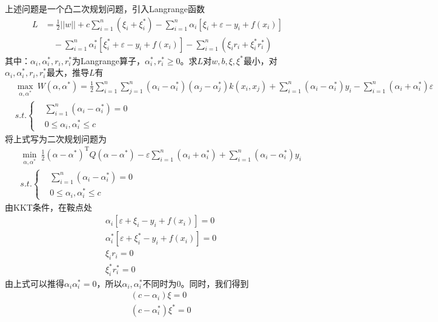     \par
    上述问题是一个凸二次规划问题，引入Langrange函数
    \begin{align*}
    L &= \frac{1}{2}||w|| + c\sum_{i=1}^n(\xi_i+\xi_i^*) -\sum_{i=1}^n \alpha_i [\xi_i+\varepsilon -y_i +f(x_i)] \\
    &\quad - \sum_{i=1}^n\alpha_i^* [\xi_i^* +\varepsilon-y_i +f(x_i)] - \sum_{i=1}^n(\xi_ir_i+\xi_i^*r_i^*)
    \end{align*}
    其中：$\alpha_i,\alpha_i^*,r_i,r_i^*$为Langrange算子，$\alpha_i^*,r_i^* \geqslant 0$。求$L$对$w,b,\xi,\xi^*$最小，对$\alpha_i,\alpha_i^*,r_i,r_i^*$最大，推导$L$有
    \begin{align*}
    & \max_{\alpha,\alpha^*} \ W(\alpha,\alpha^*) = \frac{1}{2}\sum_{i=1}^n\sum_{j=1}^n(\alpha_i - \alpha_i^*)(\alpha_j - \alpha_j^*)k(x_i,x_j)+\sum_{i=1}^n(\alpha_i-\alpha_i^*)y_i-\sum_{i=1}^n (\alpha_i+\alpha_i^*)\varepsilon\\
    & s.t.\left\{
    \begin{aligned}
    & \sum_{i=1}^n (\alpha_i-\alpha_i^*) = 0\\
    & 0 \leqslant \alpha_i,\alpha_i^* \leqslant c
    \end{aligned}
    \right.
    \end{align*}
    将上式写为二次规划问题为
    \begin{align*}
    & \min_{\alpha,\alpha^*}\ \frac{1}{2}(\alpha-\alpha^*)^\mathrm{T}Q(\alpha-\alpha^*) - \varepsilon \sum_{i=1}^n (\alpha_i+\alpha_i^*) + \sum_{i=1}^n (\alpha_i- \alpha_i^*)y_i\\
    & s.t.\left\{
    \begin{aligned}
    & \sum_{i=1}^n (\alpha_i-\alpha_i^*) = 0\\
    & 0 \leqslant \alpha_i,\alpha_i^* \leqslant c
    \end{aligned}
    \right.
    \end{align*}
    由KKT条件，在鞍点处
    \begin{align*}
    & \alpha_i [\varepsilon +\xi_i-y_i +f(x_i)] = 0\\
    & \alpha_i^* [\varepsilon +\xi_i^*-y_i +f(x_i)] = 0\\
    & \xi_i r_i = 0\\
    & \xi_i^* r_i^* = 0
    \end{align*}
    由上式可以推得$\alpha_i\alpha_i^* = 0$，所以$\alpha_i,\alpha_i^*$不同时为0。同时，我们得到
    \begin{align*}
    & (c-\alpha_i)\xi =0\\
    & (c-\alpha_i^*)\xi^* =0
    \end{align*}
